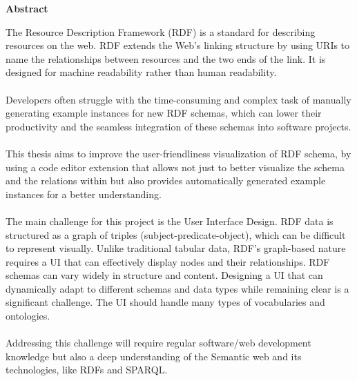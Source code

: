 \thispagestyle{empty}
\vspace*{1.0cm}

\begin{center}
    \textbf{Abstract}
\end{center}

\vspace*{0.5cm}

\noindent
The Resource Description Framework (RDF) is a standard for describing resources on the web.
RDF extends the Web’s linking structure by using URIs to name the relationships between
resources and the two ends of the link. It is designed for machine readability rather than human
readability.
\\
\\
Developers often struggle with the time-consuming and complex task of manually generating
example instances for new RDF schemas, which can lower their productivity and the seamless
integration of these schemas into software projects.
\\
\\
This thesis aims to improve the user-friendliness visualization of RDF schema, by using a code
editor extension that allows not just to better visualize the schema and the relations within but
also provides automatically generated example instances for a better understanding.
\\
\\
The main challenge for this project is the User Interface Design. RDF data is structured as a
graph of triples (subject-predicate-object), which can be difficult to represent visually. Unlike
traditional tabular data, RDF’s graph-based nature requires a UI that can effectively display
nodes and their relationships. RDF schemas can vary widely in structure and content. Designing
a UI that can dynamically adapt to different schemas and data types while remaining clear is a
significant challenge. The UI should handle many types of vocabularies and ontologies.
\\
\\
Addressing this challenge will require regular software/web development knowledge but also a
deep understanding of the Semantic web and its technologies, like RDFs and SPARQL.